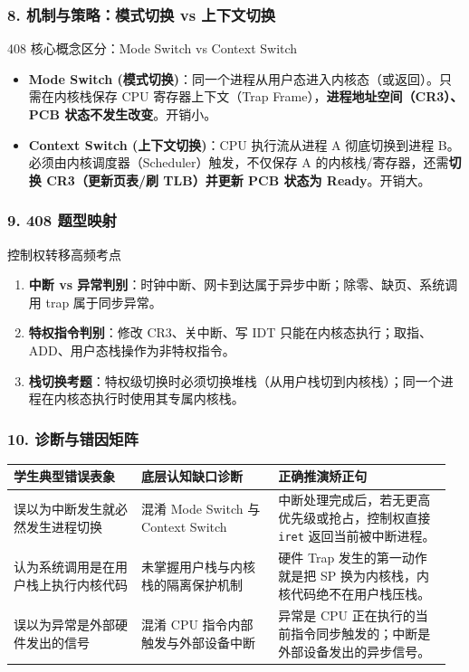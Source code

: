 \documentclass[11pt,a4paper,openany]{ctexbook}
\newcommand{\key}[1]{\textbf{\color{deep}#1}}
\begin{document}
\subsubsection*{8. 机制与策略：模式切换 vs 上下文切换}
\begin{methodbox}{408 核心概念区分：Mode Switch vs Context Switch}
\begin{itemize}
  \item \key{Mode Switch (模式切换)}：同一个进程从用户态进入内核态（或返回）。只需在内核栈保存 CPU 寄存器上下文（Trap Frame），\textbf{进程地址空间（CR3）、PCB 状态不发生改变}。开销小。
  \item \key{Context Switch (上下文切换)}：CPU 执行流从进程 A 彻底切换到进程 B。必须由内核调度器（Scheduler）触发，不仅保存 A 的内核栈/寄存器，还需\textbf{切换 CR3（更新页表/刷 TLB）并更新 PCB 状态为 Ready}。开销大。
\end{itemize}
\end{methodbox}

\subsubsection*{9. 408 题型映射}
\begin{examBox}{控制权转移高频考点}
\begin{enumerate}
  \item \textbf{中断 vs 异常判别}：时钟中断、网卡到达属于异步中断；除零、缺页、系统调用 trap 属于同步异常。
  \item \textbf{特权指令判别}：修改 CR3、关中断、写 IDT 只能在内核态执行；取指、ADD、用户态栈操作为非特权指令。
  \item \textbf{栈切换考题}：特权级切换时必须切换堆栈（从用户栈切到内核栈）；同一个进程在内核态执行时使用其专属内核栈。
\end{enumerate}
\end{examBox}

\subsubsection*{10. 诊断与错因矩阵}
\begingroup
\small
\setlength{\tabcolsep}{3pt}
\begin{longtable}{p{0.28\linewidth}p{0.30\linewidth}p{0.38\linewidth}}
\toprule
\textbf{学生典型错误表象} & \textbf{底层认知缺口诊断} & \textbf{正确推演矫正句} \\
\midrule
误以为中断发生就必然发生进程切换 & 混淆 Mode Switch 与 Context Switch & 中断处理完成后，若无更高优先级或抢占，控制权直接 \texttt{iret} 返回当前被中断进程。 \\
\midrule
认为系统调用是在用户栈上执行内核代码 & 未掌握用户栈与内核栈的隔离保护机制 & 硬件 Trap 发生的第一动作就是把 SP 换为内核栈，内核代码绝不在用户栈压栈。 \\
\midrule
误以为异常是外部硬件发出的信号 & 混淆 CPU 指令内部触发与外部设备中断 & 异常是 CPU 正在执行的当前指令同步触发的；中断是外部设备发出的异步信号。 \\
\bottomrule
\end{longtable}
\endgroup
\end{document}
